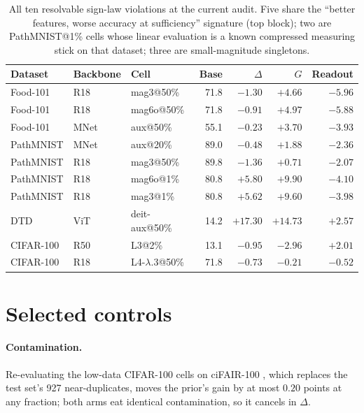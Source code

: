 \begin{table}[t]
\caption{All ten resolvable sign-law violations at the current audit.
Five share the ``better features, worse accuracy at sufficiency''
signature (top block); two are PathMNIST@1\% cells whose linear evaluation is a
known compressed measuring stick on that dataset; three are
small-magnitude singletons.}
\label{tab:exceptions}
\centering\scriptsize
\setlength{\tabcolsep}{2.6pt}
\begin{tabular}{@{}lllrrrr@{}}
\toprule
Dataset & Backbone & Cell & Base & $\Delta$ & $G$ & Readout \\
\midrule
Food-101 & R18 & mag3@50\% & 71.8 & $-1.30$ & $+4.66$ & $-5.96$ \\
Food-101 & R18 & mag6o@50\% & 71.8 & $-0.91$ & $+4.97$ & $-5.88$ \\
Food-101 & MNet & aux@50\% & 55.1 & $-0.23$ & $+3.70$ & $-3.93$ \\
PathMNIST & MNet & aux@20\% & 89.0 & $-0.48$ & $+1.88$ & $-2.36$ \\
PathMNIST & R18 & mag3@50\% & 89.8 & $-1.36$ & $+0.71$ & $-2.07$ \\
\midrule
PathMNIST & R18 & mag6o@1\% & 80.8 & $+5.80$ & $+9.90$ & $-4.10$ \\
PathMNIST & R18 & mag3@1\% & 80.8 & $+5.62$ & $+9.60$ & $-3.98$ \\
\midrule
DTD & ViT & deit-aux@50\% & 14.2 & $+17.30$ & $+14.73$ & $+2.57$ \\
CIFAR-100 & R50 & L3@2\% & 13.1 & $-0.95$ & $-2.96$ & $+2.01$ \\
CIFAR-100 & R18 & L4-$\lambda.3$@50\% & 71.8 & $-0.73$ & $-0.21$ & $-0.52$ \\
\bottomrule
\end{tabular}
\end{table}

\section{Selected controls}\label{app:controls}

\paragraph{Contamination.} Re-evaluating the low-data CIFAR-100 cells on
ciFAIR-100 \citep{barz2020cifair}, which replaces the test set's 927
near-duplicates, moves the prior's gain by at most $0.20$ points at any
fraction; both arms eat identical contamination, so it cancels in
$\Delta$.

